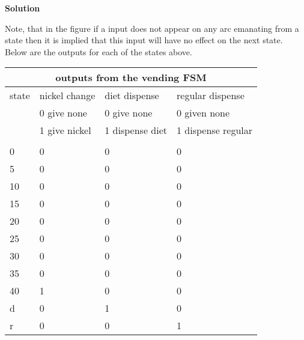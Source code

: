 \begin{enumerate}
        \begin{onlysolution}  \textbf{Solution} \itshape{

                \begin{figure}[ht]
                \end{figure}

                Note, that in the figure if a input does not appear on
                any arc emanating from a state then it is implied that
                this input will have no effect on the next state.  Below
                are the outputs for each of the states above.

                \begin{tabular}{|l||l|l|l|} \hline
                    \multicolumn{4}{|c|}{outputs from the vending FSM}              \\ \hline \hline
                    state & nickel change    & diet dispense & regular dispense      \\ \hline
                    & 0 give none    & 0 give none    & 0 given none        \\ \hline
                    & 1 give nickel    & 1 dispense diet & 1 dispense regular    \\ \hline
                    &         &        &            \\ \hline
                    0     & 0        & 0        & 0            \\ \hline
                    5     & 0        & 0        & 0            \\ \hline
                    10    & 0        & 0        & 0            \\ \hline
                    15    & 0        & 0        & 0            \\ \hline
                    20    & 0        & 0        & 0            \\ \hline
                    25    & 0        & 0        & 0            \\ \hline
                    30    & 0        & 0        & 0            \\ \hline
                    35    & 0        & 0        & 0            \\ \hline
                    40    & 1        & 0        & 0            \\ \hline
                    d     & 0        & 1        & 0            \\ \hline
                    r     & 0        & 0        & 1            \\ \hline
                \end{tabular}
            }
        \end{onlysolution}


\end{enumerate}
